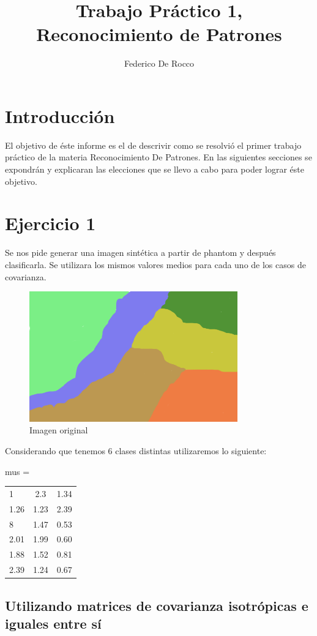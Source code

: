 \documentclass[a4paper,10pt]{article}
\title{Trabajo Práctico 1, Reconocimiento de Patrones}
\author{Federico De Rocco}
\begin{document}
\maketitle
\section{Introducci\'on}
El objetivo de \'este informe es el de descrivir como se resolvi\'o el primer trabajo práctico de la materia Reconocimiento De Patrones. En las siguientes secciones se expondr\'an y explicaran las elecciones que se llevo a cabo para poder lograr \'este objetivo.

\section{Ejercicio 1}
Se nos pide generar una imagen sint\'etica a partir de phantom y despu\'es clasificarla. Se utilizara los mismos valores medios para cada uno de los casos de covarianza. 

\begin{figure}[H]
\centering
\includegraphics[width=90mm]{phantom.png}
\caption{Imagen original}
\end{figure}

Considerando que tenemos 6 clases distintas utilizaremos lo siguiente:

mus = 
\begin{tabular}{ l c r }
  1 & 2.3 & 1.34 \\
  1.26 & 1.23 & 2.39 \\
  8 & 1.47 & 0.53 \\
  2.01 & 1.99 & 0.60\\
  1.88 & 1.52 & 0.81 \\
  2.39 & 1.24 & 0.67\\
\end{tabular}

\subsection{Utilizando matrices de covarianza isotr\'opicas e iguales entre s\'i}
\end{document}
